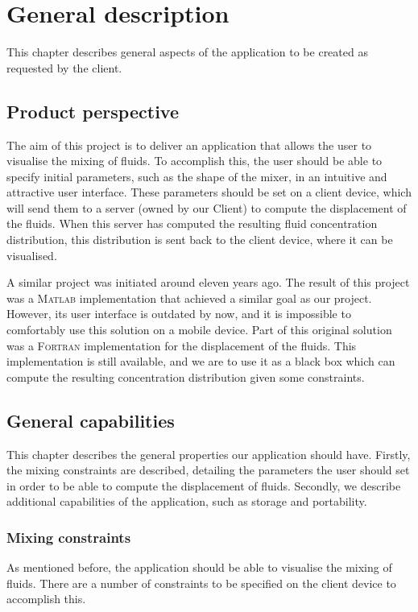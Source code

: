 \chapter{General description}
This chapter describes general aspects of the application to be created as requested by the client.

\section{Product perspective} %
The aim of this project is to deliver an application that allows the user to visualise the mixing of fluids. To accomplish this, the user should be able to specify initial parameters, such as the shape of the mixer, in an intuitive and attractive user interface. These parameters should be set on a client device, which will send them to a server (owned by our Client) to compute the displacement of the fluids. When this server has computed the resulting fluid concentration distribution, this distribution is sent back to the client device, where it can be visualised.

A similar project was initiated around eleven years ago. The result of this project was a \textsc{Matlab} implementation that achieved a similar goal as our project. However, its user interface is outdated by now, and it is impossible to comfortably use this solution on a mobile device. Part of this original solution was a \textsc{Fortran} implementation for the displacement of the fluids. This implementation is still available, and we are to use it as a black box which can compute the resulting concentration distribution given some constraints.

\section{General capabilities}
This chapter describes the general properties our application should have. Firstly, the mixing constraints are described, detailing the parameters the user should set in order to be able to compute the displacement of fluids. Secondly, we describe additional capabilities of the application, such as storage and portability.

\subsection{Mixing constraints}\label{mixingconstraints}
As mentioned before, the application should be able to visualise the mixing of fluids. There are a number of constraints to be specified on the client device to accomplish this.

